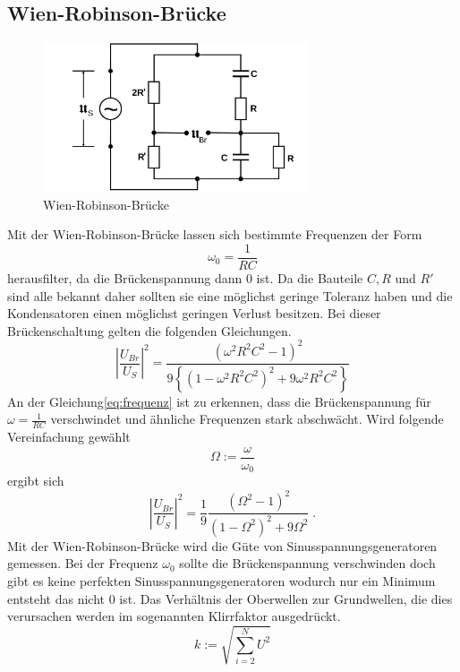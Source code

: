 \subsection{Wien-Robinson-Brücke}
\begin{figure}
  \centering
  \includegraphics[width=0.7\textwidth]{Bilder/Wien_Robinsonbruecke.png}
  \caption{Wien-Robinson-Brücke}
  \label{fig:WBBruecke}
\end{figure}
Mit der Wien-Robinson-Brücke lassen sich bestimmte Frequenzen der Form
\begin{equation}
\omega_0=\frac{1}{RC}
\end{equation}
herausfilter, da die Brückenspannung dann $0$ ist. Da die Bauteile $C,R$ und $R'$
sind alle bekannt daher sollten sie eine möglichst geringe Toleranz haben und
die Kondensatoren einen möglichst geringen Verlust besitzen. Bei dieser
Brückenschaltung gelten die folgenden Gleichungen.
\begin{equation}
\left|\frac{U_{Br}}{U_S}\right|^2=\frac{(\omega^2R^2C^2-1)^2}
{9\left\{(1-\omega^2 R^2 C^2)^2+9\omega^2R^2C^2\right\}}
\label{eq:frequenz}
\end{equation}
An der Gleichung\eqref{eq:frequenz} ist zu erkennen, dass die Brückenspannung
für $\omega=\frac{1}{RC}$ verschwindet und ähnliche Frequenzen stark abschwächt.
Wird folgende Vereinfachung gewählt
\begin{equation}
\Omega:=\frac{\omega}{\omega_0}
\end{equation}
ergibt sich
\begin{equation}
\left|\frac{U_{Br}}{U_S}\right|^2=\frac{1}{9}\frac{(\Omega^2-1)^2}
{(1-\Omega^2)^2+9\Omega^2}  \; .
\end{equation}
Mit der Wien-Robinson-Brücke wird die Güte von Sinusspannungsgeneratoren gemessen.
Bei der Frequenz $\omega_0$ sollte die Brückenspannung verschwinden doch gibt es
keine perfekten Sinusspannungsgeneratoren wodurch nur ein Minimum entsteht das nicht
$0$ ist. Das Verhältnis der Oberwellen zur Grundwellen, die dies verursachen werden
im sogenannten Klirrfaktor ausgedrückt.
\begin{equation}
k:=\sqrt{\sum_{i=2}^N U^2}
\end{equation}
